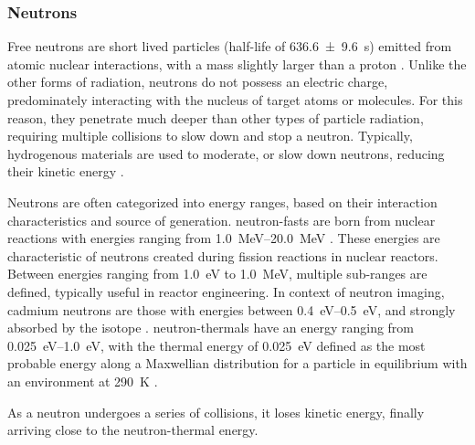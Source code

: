 \documentclass[../../../../main.tex]{subfiles}%
\begin{document}
%
    \subsubsection{Neutrons}%
    \label{sec:chapter-2:radiation-detection:types-of-radiation:neutrons}%
    Free neutrons are short lived particles (half-life of \SI{636.6(96)}{\second}) emitted from atomic nuclear interactions, with a mass slightly larger than a proton \cite{Christensen_1972}.
    Unlike the other forms of radiation, neutrons do not possess an electric charge, predominately interacting with the nucleus of target atoms or molecules.
    For this reason, they penetrate much deeper than other types of particle radiation, requiring multiple collisions to slow down and stop a neutron.
    Typically, hydrogenous materials are used to moderate, or slow down neutrons, reducing their kinetic energy \cite{book:Knief_2008}.
    \par%
    Neutrons are often categorized into energy ranges, based on their interaction characteristics and source of generation.
    \Glspl{neutron-fast} are born from nuclear reactions with energies ranging from \SIrange{1.0}{20.0}{\mega\electronvolt} \cite{book:Turner_1995}.
    These energies are characteristic of neutrons created during fission reactions in nuclear reactors.
    Between energies ranging from \SI{1.0}{\electronvolt} to \SI{1.0}{\mega\electronvolt}, multiple sub-ranges are defined, typically useful in reactor engineering.
    In context of neutron imaging, cadmium neutrons are those with energies between \SIrange{0.4}{0.5}{\electronvolt}, and strongly absorbed by the isotope .
    \Glspl{neutron-thermal} have an energy ranging from \SIrange{0.025}{1.0}{\electronvolt},  with the thermal energy of \SI{0.025}{\electronvolt} defined as the most probable energy along a Maxwellian distribution for a particle in equilibrium with an environment at \SI{290}{\kelvin} \cite{book:Turner_1995}.
    \par%
    As a neutron undergoes a series of collisions, it loses kinetic energy, finally arriving close to the \gls{neutron-thermal} energy.
\end{document}
